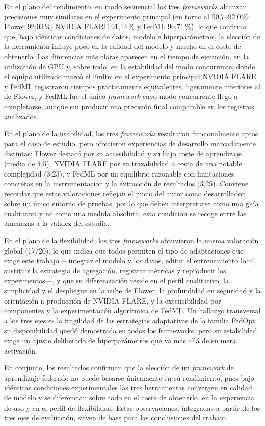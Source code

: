 En el plano del rendimiento, en modo secuencial los tres \textit{frameworks} alcanzan
precisiones muy similares en el experimento principal (en torno al 90,7--92,0\,\%: Flower
92{,}03\,\%, NVIDIA FLARE 91{,}14\,\% y FedML 90{,}71\,\%), lo que confirma que, bajo
idénticas condiciones de datos, modelo e hiperparámetros, la elección de la herramienta
influye poco en la calidad del modelo y mucho en el coste de obtenerlo. Las diferencias
más claras aparecen en el tiempo de ejecución, en la utilización de GPU y, sobre todo,
en la estabilidad del modo concurrente, donde el equipo utilizado marcó el límite: en el
experimento principal NVIDIA FLARE y FedML registraron tiempos prácticamente equivalentes,
ligeramente inferiores al de Flower, y FedML fue el único \textit{framework} cuyo modo
concurrente llegó a completarse, aunque sin producir una precisión final comparable en los
registros analizados.

En el plano de la usabilidad, los tres \textit{frameworks} resultaron funcionalmente
aptos para el caso de estudio, pero ofrecieron experiencias de desarrollo marcadamente
distintas: Flower destacó por su accesibilidad y su bajo coste de aprendizaje (media de
4{,}5), NVIDIA FLARE por su trazabilidad a costa de una notable complejidad (3{,}25), y
FedML por un equilibrio razonable con limitaciones concretas en la instrumentación y la
extracción de resultados (3{,}25). Conviene recordar que estas valoraciones reflejan el
juicio del autor como desarrollador sobre un único entorno de pruebas, por lo que deben
interpretarse como una guía cualitativa y no como una medida absoluta; esta condición se
recoge entre las amenazas a la validez del estudio.

En el plano de la flexibilidad, los tres \textit{frameworks} obtuvieron la misma
valoración global (17/20), lo que indica que todos permiten el tipo de adaptaciones que
exige este trabajo —integrar el modelo y los datos, editar el entrenamiento local,
sustituir la estrategia de agregación, registrar métricas y reproducir los
experimentos—, y que su diferenciación reside en el perfil cualitativo: la simplicidad y
el despliegue en la nube de Flower, la profundidad en seguridad y la orientación a
producción de NVIDIA FLARE, y la extensibilidad por componentes y la experimentación
algorítmica de FedML. Un hallazgo transversal a los tres ejes es la fragilidad de las
estrategias adaptativas de la familia FedOpt: su disponibilidad quedó demostrada en
todos los frameworks, pero su estabilidad exige un ajuste deliberado de hiperparámetros
que va más allá de su mera activación.

En conjunto, los resultados confirman que la elección de un \textit{framework} de
aprendizaje federado no puede basarse únicamente en su rendimiento, pues bajo idénticas
condiciones experimentales las tres herramientas convergen en calidad de modelo y se
diferencian sobre todo en el coste de obtenerlo, en la experiencia de uso y en el perfil
de flexibilidad. Estas observaciones, integradas a partir de los tres ejes de
evaluación, sirven de base para las conclusiones del trabajo.
